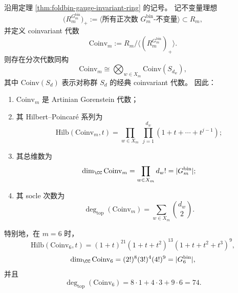 \begin{theorem}\label{thm:foldbin-coinvariant-gorenstein}
沿用定理 \ref{thm:foldbin-gauge-invariant-ring} 的记号。
记不变量理想
\[
\bigl(R_m^{G_m^{\mathrm{bin}}}\bigr)_+
:=
\langle \text{所有正次数 }G_m^{\mathrm{bin}}\text{-不变量}\rangle
\subset R_m,
\]
并定义 coinvariant 代数
\[
\mathrm{Coinv}_m
:=
R_m\big/\langle (R_m^{G_m^{\mathrm{bin}}})_+\rangle.
\]
则存在分次代数同构
\[
\mathrm{Coinv}_m
\cong
\bigotimes_{w\in X_m}\mathrm{Coinv}(S_{d_w}),
\]
其中 \(\mathrm{Coinv}(S_d)\) 表示对称群 \(S_d\) 的经典 coinvariant 代数。
因此：
\begin{enumerate}
  \item \(\mathrm{Coinv}_m\) 是 Artinian Gorenstein 代数；
  \item 其 Hilbert--Poincar\'e 系列为
  \begin{equation}\label{eq:foldbin-coinvariant-hilbert}
  \mathrm{Hilb}(\mathrm{Coinv}_m,t)
  =
  \prod_{w\in X_m}\ \prod_{j=1}^{d_w}(1+t+\cdots+t^{j-1});
  \end{equation}
  \item 其总维数为
  \begin{equation}\label{eq:foldbin-coinvariant-dimension}
  \dim_{\CC}\mathrm{Coinv}_m
  =
  \prod_{w\in X_m}d_w!
  =
  |G_m^{\mathrm{bin}}|;
  \end{equation}
  \item 其 socle 次数为
  \begin{equation}\label{eq:foldbin-coinvariant-top-degree}
  \deg_{\mathrm{top}}(\mathrm{Coinv}_m)
  =
  \sum_{w\in X_m}\binom{d_w}{2}.
  \end{equation}
\end{enumerate}
特别地，在 \(m=6\) 时，
\[
\mathrm{Hilb}(\mathrm{Coinv}_6,t)
=(1+t)^{21}(1+t+t^2)^{13}(1+t+t^2+t^3)^9,
\]
\[
\dim_{\CC}\mathrm{Coinv}_6
=(2!)^8(3!)^4(4!)^9
=|G_6^{\mathrm{bin}}|,
\]
并且
\[
\deg_{\mathrm{top}}(\mathrm{Coinv}_6)=8\cdot 1+4\cdot 3+9\cdot 6=74.
\]
\end{theorem}
